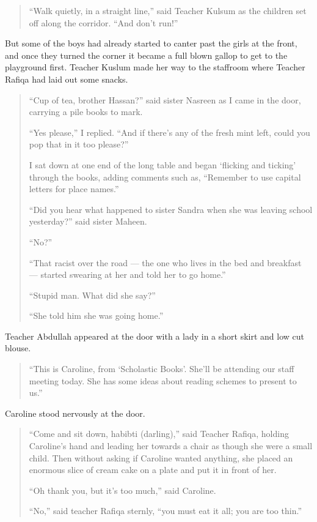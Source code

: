 \documentclass[12pt]{memoir}
\begin{document}
\begin{quote}
“Walk quietly, in a straight line,”
said Teacher Kulsum as the children set off along the corridor.
“And don’t run!”
\end{quote}

But some of the boys had already started to canter past the girls at the front,
and once they turned the corner it became a full blown gallop
to get to the playground first.
Teacher Kuslum made her way to the staffroom
where Teacher Rafiqa had laid out some snacks.

\begin{quote}
“Cup of tea, brother Hassan?”
said sister Nasreen as I came in the door,
carrying a pile books to mark.

“Yes please,” I replied.
“And if there’s any of the fresh mint left,
could you pop that in it too please?”

I sat down at one end of the long table
and began ‘flicking and ticking’ through the books, adding comments such as,
“Remember to use capital letters for place names.”

“Did you hear what happened to sister Sandra
when she was leaving school yesterday?” said sister Maheen.

“No?”

“That racist over the road — the one who lives in the bed and breakfast —
started swearing at her and told her to go home.”

“Stupid man.
What did she say?”

“She told him she was going home.”
\end{quote}

Teacher Abdullah appeared at the door with a lady
in a short skirt and low cut blouse.

\begin{quote}
“This is Caroline, from ‘Scholastic Books’.
She’ll be attending our staff meeting today.
She has some ideas about reading schemes to present to us.”
\end{quote}

Caroline stood nervously at the door.

\begin{quote}
“Come and sit down, habibti (darling),” said Teacher Rafiqa,
holding Caroline’s hand and leading her towards a chair
as though she were a small child.
Then without asking if Caroline wanted anything,
she placed an enormous slice of cream cake
on a plate and put it in front of her.

“Oh thank you, but it’s too much,” said Caroline.

“No,” said teacher Rafiqa sternly, “you must eat it all; you are too thin.”
\end{quote}
\end{document}
